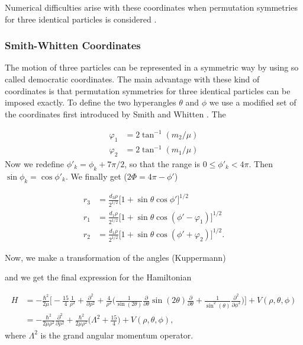 \documentclass{article}
\numberwithin{equation}{section}
\numberwithin{figure}{section}
\begin{document}
Numerical difficulties arise with these coordinates when permutation symmetries for three identical particles is considered \cite{rimondo_berman_lin}. 


\subsubsection{Smith-Whitten Coordinates}\label{smith_whitten}

The motion of three particles can be represented in a symmetric way by using so called democratic coordinates. The main advantage with these kind of coordinates is that permutation symmetries for three identical particles can be imposed exactly. To define the two hyperangles $\theta$ and $\phi$ we use a modified set of the coordinates first introduced by Smith and Whitten \cite{Smith_Whitten1968}. The 

\begin{align}
\varphi_1 &= 2\tan^{-1}(m_2/\mu)\\
\varphi_2 &= 2\tan^{-1}(m_1/\mu)
\end{align}
Now we redefine $\phi'_k = \phi_k+7\pi/2$, so that the range is $0 \leq \phi'_k < 4\pi$. Then $\sin\phi_k = \cos\phi'_k$. We finally get ($2\Phi = 4\pi - \phi'$)

\begin{align}
r_3 &= \frac{d_3\rho}{2^{1/2}}\big[1+\sin\theta\cos\phi'\big]^{1/2}\\
r_1 &= \frac{d_1\rho}{2^{1/2}}\big[1 + \sin\theta\cos(\phi'-\varphi_1)\big]^{1/2}\\
r_2 &= \frac{d_1\rho}{2^{1/2}}\big[1 + \sin\theta\cos(\phi' + \varphi_2)\big]^{1/2}.
\end{align}


Now, we make a transformation of the angles (Kuppermann)


and we get the final expression for the Hamiltonian

\begin{align}
H &= -\frac{\hbar^{2}}{2 \mu} \Bigg[ -\frac{15}{4} \frac{1}{\rho^{2}} + \frac{\partial^{2}}{\partial \rho^{2}}+ \frac{4}{\rho^{2}}\Big( \frac{1}{\sin(2\theta)} \frac{\partial}{\partial \theta} \sin(2\theta) \frac{\partial}{\partial \theta} + \frac{1}{\sin^{2}(\theta)} \frac{\partial^{2}}{\partial \phi^{2}} \Big) \Bigg] + V(\rho, \theta, \phi)\\
    &= -\frac{\hbar^{2}}{2 \mu \rho^{2} }\frac{\partial^2}{\partial \rho^2} + \frac{\hbar^{2}}{2 \mu \rho^{2} } \Bigg(\Lambda^2 + \frac{15}{4}\Bigg)+ V(\rho, \theta, \phi),
\end{align}
where $\Lambda^2$ is the grand angular momentum operator. 
\end{document}
